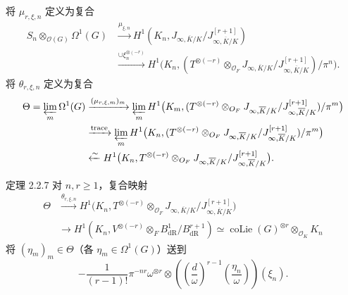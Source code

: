 将 $\mu_{r,\xi,n}$ 定义为复合
\begin{align*}
 S_n\otimes_{\mathcal O(G)}\Omega^1(G)
 &\xrightarrow{\mu_{\xi,n}}H^1(K_n,J_{\infty,\overline K/K}/J^{[r+1]}_{\infty,\overline K/K})\\
 &\xrightarrow{\cup\xi_n^{\otimes(-r)}}H^1\bigl(K_n,(T^{\otimes(-r)}\otimes_{\mathcal O_F}
 J_{\infty,\overline K/K}/J^{[r+1]}_{\infty,\overline K/K})/\pi^n\bigr).
\end{align*}
将 $\theta_{r,\xi,n}$ 定义为复合
\begin{align*}
 \Theta=\varprojlim_m\Omega^1(G)
 &\xrightarrow{(\mu_{r,\xi,m})_m}\varprojlim_m H^1\bigl(K_m,(T^{\otimes(-r)}\otimes_{\mathcal O_F}
 J_{\infty,\overline K/K}/J^{[r+1]}_{\infty,\overline K/K})/\pi^m\bigr)\\
 &\xrightarrow{\mathrm{trace}}\varprojlim_m H^1\bigl(K_n,(T^{\otimes(-r)}\otimes_{\mathcal O_F}
 J_{\infty,\overline K/K}/J^{[r+1]}_{\infty,\overline K/K})/\pi^m\bigr)\\
 &\xleftarrow{\sim}H^1\bigl(K_n,T^{\otimes(-r)}\otimes_{\mathcal O_F}
 J_{\infty,\overline K/K}/J^{[r+1]}_{\infty,\overline K/K}\bigr).
\end{align*}
\begin{statement}{定理 2.2.7}
对 $n,r\ge1$，复合映射
\begin{align*}
 \Theta&\xrightarrow{\theta_{r,\xi,n}}H^1\bigl(K_n,T^{\otimes(-r)}\otimes_{\mathcal O_F}
 J_{\infty,\overline K/K}/J^{[r+1]}_{\infty,\overline K/K}\bigr)\\
 &\longrightarrow H^1(K_n,V^{\otimes(-r)}\otimes_F B^1_{\mathrm{dR}}/B^{r+1}_{\mathrm{dR}})
 \simeq\operatorname{coLie}(G)^{\otimes r}\otimes_{\mathcal O_K}K_n
\end{align*}
将 $(\eta_m)_m\in\Theta$（各 $\eta_m\in\Omega^1(G)$）送到
\[
 -\frac{1}{(r-1)!}\pi^{-nr}\omega^{\otimes r}\otimes
 \left(\left(\frac d\omega\right)^{r-1}\left(\frac{\eta_n}{\omega}\right)\right)(\xi_n).
\]
\end{statement}
